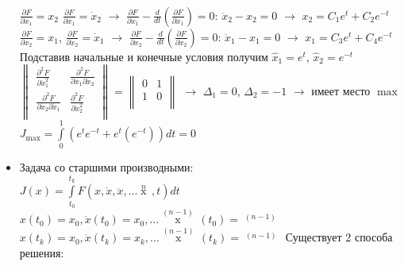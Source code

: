 \documentclass[preprint,russian,a5paper,10pt,twoside,mediummath]{ncc}
\begin{document}
\begin{itemize}
\\$\frac{\partial F}{\partial {{x}_{1}}}={{x}_{2}}$ $\frac{\partial F}{\partial {{{\dot{x}}}_{1}}}={{\dot{x}}_{2}}$ $\to $ $\frac{\partial F}{\partial {{x}_{1}}}-\frac{d}{dt}\left( \frac{\partial F}{\partial {{{\dot{x}}}_{1}}} \right)=0$: ${{\ddot{x}}_{2}}-{{x}_{2}}=0$ $\to $ ${{x}_{2}}={{C}_{1}}{{e}^{t}}+{{C}_{2}}{{e}^{-t}}$
\\$\frac{\partial F}{\partial {{x}_{2}}}={{x}_{1}}$, $\frac{\partial F}{\partial {{{\dot{x}}}_{2}}}={{\dot{x}}_{1}}$ $\to$ $\frac{\partial F}{\partial {{x}_{2}}}-\frac{d}{dt}\left( \frac{\partial F}{\partial {{{\dot{x}}}_{2}}} \right)=0$: ${{\ddot{x}}_{1}}-{{x}_{1}}=0$ $\to$ ${{x}_{1}}={{C}_{3}}{{e}^{t}}+{{C}_{4}}{{e}^{-t}}$
\\Подставив начальные и конечные условия получим ${{\hat{x}}_{1}}={{e}^{t}}$, ${{\hat{x}}_{2}}={{e}^{-t}}$
$\left\| \begin{matrix}
   \frac{{{\partial }^{2}}F}{\partial \dot{x}_{1}^{2}} & \frac{{{\partial }^{2}}F}{\partial {{{\dot{x}}}_{1}}\partial {{{\dot{x}}}_{2}}}  \\
   \frac{{{\partial }^{2}}F}{\partial {{{\dot{x}}}_{2}}\partial {{{\dot{x}}}_{1}}} & \frac{{{\partial }^{2}}F}{\partial \dot{x}_{2}^{2}}  \\
\end{matrix} \right\|=\left\| \begin{matrix}
   0 & 1  \\
   1 & 0  \\
\end{matrix} \right\|$ $\to $  ${{\Delta }_{1}}=0$, ${{\Delta }_{2}}=-1$ $\to $ имеет место \underline{$\max $}
\\${{J}_{\max }}=\int\limits_{0}^{1}{\left( {{e}^{t}}{{e}^{-t}}+{{e}^{t}}\left( {{e}^{-t}} \right) \right)}dt=0$
\item Задача со старшими производными:
\\$J\left( x \right)=\int\limits_{{{t}_{0}}}^{{{t}_{k}}}{F\left( x,\dot{x},\ddot{x},...\overset{n}{\mathop{x}}\,,t \right)}dt$
\\$x\left( {{t}_{0}} \right)={{x}_{0}},\dot{x}\left( {{t}_{0}} \right)={{x}_{0}},...\overset{\left( n-1 \right)}{\mathop{x}}\,\left( {{t}_{0}} \right)=\overset{\left( n-1 \right)}{\mathop{{{x}_{0}}}}\,$
\\$x\left( {{t}_{k}} \right)={{x}_{0}},\dot{x}\left( {{t}_{k}} \right)={{x}_{k}},...\overset{\left( n-1 \right)}{\mathop{x}}\,\left( {{t}_{k}} \right)=\overset{\left( n-1 \right)}{\mathop{{{x}_{k}}}}\,$
Существует 2 способа решения:

\end{itemize}
\end{document}
